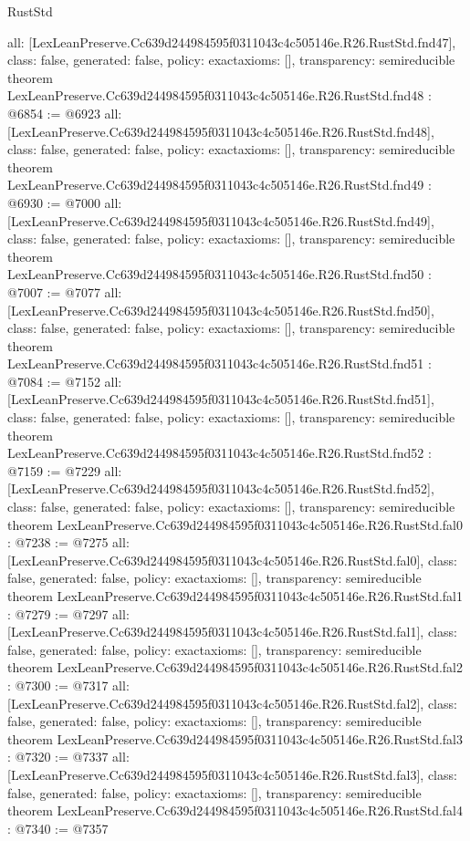 \begin{lexlean}{RustStd}
\begin{coremodule}
{  all: [LexLeanPreserve.Cc639d244984595f0311043c4c505146e.R26.RustStd.fnd47],
  class: false,
  generated: false,
  policy: exact{axioms: []},
  transparency: semireducible
}
theorem LexLeanPreserve.Cc639d244984595f0311043c4c505146e.R26.RustStd.fnd48 : @6854 := @6923 {
  all: [LexLeanPreserve.Cc639d244984595f0311043c4c505146e.R26.RustStd.fnd48],
  class: false,
  generated: false,
  policy: exact{axioms: []},
  transparency: semireducible
}
theorem LexLeanPreserve.Cc639d244984595f0311043c4c505146e.R26.RustStd.fnd49 : @6930 := @7000 {
  all: [LexLeanPreserve.Cc639d244984595f0311043c4c505146e.R26.RustStd.fnd49],
  class: false,
  generated: false,
  policy: exact{axioms: []},
  transparency: semireducible
}
theorem LexLeanPreserve.Cc639d244984595f0311043c4c505146e.R26.RustStd.fnd50 : @7007 := @7077 {
  all: [LexLeanPreserve.Cc639d244984595f0311043c4c505146e.R26.RustStd.fnd50],
  class: false,
  generated: false,
  policy: exact{axioms: []},
  transparency: semireducible
}
theorem LexLeanPreserve.Cc639d244984595f0311043c4c505146e.R26.RustStd.fnd51 : @7084 := @7152 {
  all: [LexLeanPreserve.Cc639d244984595f0311043c4c505146e.R26.RustStd.fnd51],
  class: false,
  generated: false,
  policy: exact{axioms: []},
  transparency: semireducible
}
theorem LexLeanPreserve.Cc639d244984595f0311043c4c505146e.R26.RustStd.fnd52 : @7159 := @7229 {
  all: [LexLeanPreserve.Cc639d244984595f0311043c4c505146e.R26.RustStd.fnd52],
  class: false,
  generated: false,
  policy: exact{axioms: []},
  transparency: semireducible
}
theorem LexLeanPreserve.Cc639d244984595f0311043c4c505146e.R26.RustStd.fal0 : @7238 := @7275 {
  all: [LexLeanPreserve.Cc639d244984595f0311043c4c505146e.R26.RustStd.fal0],
  class: false,
  generated: false,
  policy: exact{axioms: []},
  transparency: semireducible
}
theorem LexLeanPreserve.Cc639d244984595f0311043c4c505146e.R26.RustStd.fal1 : @7279 := @7297 {
  all: [LexLeanPreserve.Cc639d244984595f0311043c4c505146e.R26.RustStd.fal1],
  class: false,
  generated: false,
  policy: exact{axioms: []},
  transparency: semireducible
}
theorem LexLeanPreserve.Cc639d244984595f0311043c4c505146e.R26.RustStd.fal2 : @7300 := @7317 {
  all: [LexLeanPreserve.Cc639d244984595f0311043c4c505146e.R26.RustStd.fal2],
  class: false,
  generated: false,
  policy: exact{axioms: []},
  transparency: semireducible
}
theorem LexLeanPreserve.Cc639d244984595f0311043c4c505146e.R26.RustStd.fal3 : @7320 := @7337 {
  all: [LexLeanPreserve.Cc639d244984595f0311043c4c505146e.R26.RustStd.fal3],
  class: false,
  generated: false,
  policy: exact{axioms: []},
  transparency: semireducible
}
theorem LexLeanPreserve.Cc639d244984595f0311043c4c505146e.R26.RustStd.fal4 : @7340 := @7357 {
}
\end{coremodule}
\end{lexlean}
